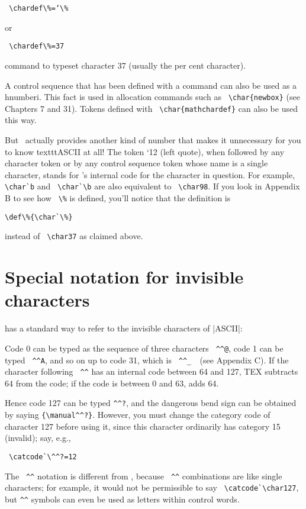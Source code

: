 \verb+ \chardef\%=‘\%+

or 

\verb+ \chardef\%=37   +

command to typeset character 37 (usually the per cent character).

A control sequence that has been defined with a \cmd{\chardef} command can also be used as a hnumberi.
This fact is used in allocation commands such as \verb+ \char{newbox}+ (see Chapters 7 and 31). Tokens defined
with \verb+ \char{mathchardef}+ can also be used this way.


But \tex\ actually provides another kind of number that makes it unnecessary
for you to know texttt{ASCII} at all! The token `12 (left quote), when followed by
any character token or by any control sequence token whose name is a single character,
stands for \tex's internal code for the character in question. For example, \verb+\char`b+ and
\verb+ \char`\b+ are also equivalent to \verb+ \char98+. If you look in Appendix B to see how \verb+ \%+ is
defined, you'll notice that the definition is

\verb+\def\%{\char`\%}+

instead of \verb+ \char37+  as claimed above.

\section{Special notation for invisible characters}

\tex has a standard way to refer to the invisible characters of |ASCII|: 

Code 0 can be typed as the sequence of three characters \verb+ ^^@+, code 1 can be typed
\verb+ ^^A+, and so on up to code 31, which is \verb+ ^^_  +(see Appendix C). If the character following
\verb+ ^^+ has an internal code between 64 and 127, TEX subtracts 64 from the code; if the
code is between 0 and 63, \tex adds 64. 

Hence code 127 can be typed \verb+^^?+, and
the dangerous bend sign can be obtained by saying \verb+{\manual^^?}+. However, you must
change the category code of character 127 before using it, since this character ordinarily
has category 15 (invalid); say, e.g., 

\verb+ \catcode`\^^?=12 +

The \verb+ ^^+ notation is different from
\cmd{\char}, because \verb+ ^^+ combinations are like single characters; for example, it would not
be permissible to say \verb+ \catcode`\char127+, but \verb+^^+ symbols can even be used as letters within control words.

